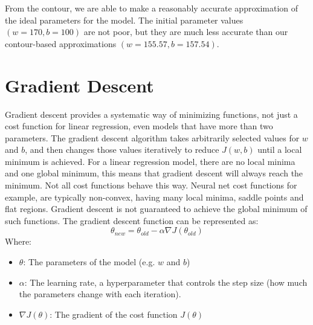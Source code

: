 \documentclass{article}
\begin{document}
\noindent From the contour, we are able to make a reasonably accurate approximation of the ideal parameters for the model. The initial parameter values $(w=170, b=100)$ are not poor, but they are much less accurate than our contour-based approximations $(w=155.57, b=157.54)$.

\section{Gradient Descent}
Gradient descent provides a systematic way of minimizing functions, not just a cost function for linear regression, even models that have more than two parameters. The gradient descent algorithm takes arbitrarily selected values for $w$ and $b$, and then changes those values iteratively to reduce $J(w,b)$ until a local minimum is achieved. For a linear regression model, there are no local minima and one global minimum, this means that gradient descent will always reach the minimum. Not all cost functions behave this way. Neural net cost functions for example, are typically non-convex, having many local minima, saddle points and flat regions. Gradient descent is not guaranteed to achieve the global minimum of such functions. The gradient descent function can be represented as:
\[\theta_{new} = \theta_{old} - \alpha \nabla J(\theta_{old}) \]
\noindent Where:

\begin{itemize}
\item $\theta$: The parameters of the model (e.g. $w$ and $b$)
\item $\alpha$: The learning rate, a hyperparameter that controls the step size (how much the parameters change with each iteration).
\item $\nabla J(\theta)$: The gradient of the cost function $J(\theta)$
\end{itemize}
\end{document}
